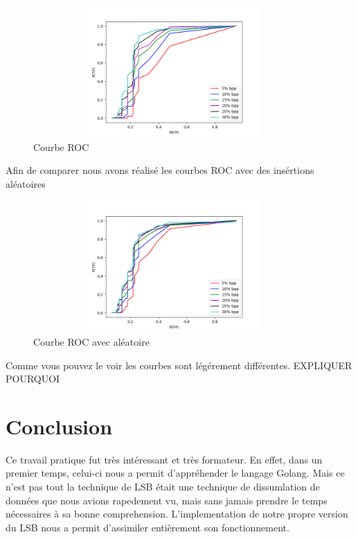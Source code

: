 \documentclass[letterpaper,12pt, french]{article}
\begin{document}
\begin{figure}[htbp]
\centering
\includegraphics[width=400px, height=190px]{./images/courbe_roc.png}
\caption{\label{fig:org6dc2ee0}
Courbe ROC}
\end{figure}
\pagebreak
Afin de comparer nous avons réalisé les courbes ROC avec des insértions aléatoires

\begin{figure}[htbp]
\centering
\includegraphics[width=400px, height=190px]{./images/courbe_roc_seed.png}
\caption{\label{fig:org04a80b2}
Courbe ROC avec aléatoire}
\end{figure}

Comme vous pouvez le voir les courbes sont légérement différentes.
EXPLIQUER POURQUOI
\clearpage
\section{Conclusion}

Ce travail pratique fut très intéressant et très formateur. En effet, dans un premier temps, celui-ci nous a permit
d'appréhender le langage Golang. Mais ce n'est pas tout la technique de LSB était 
une technique de dissumlation de données que nous avions rapedement vu,
mais sans jamais prendre le temps nécessaires à sa bonne comprehension. L'implementation
de notre propre version du LSB nous a permit d'assimiler entièrement son fonctionnement.


\label{sec:orgf6fc50a}

\pagebreak
\end{document}
